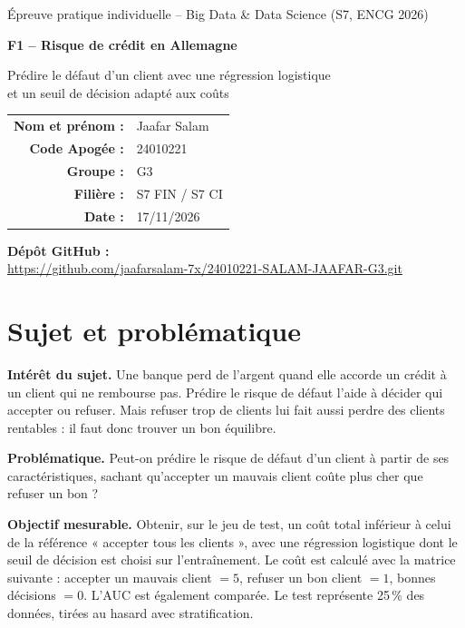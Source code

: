 \documentclass[11pt,a4paper]{article}
\begin{document}
\begin{titlepage}
\centering
\vspace*{2cm}
{\large Épreuve pratique individuelle -- Big Data \& Data Science (S7, ENCG 2026)\par}
\vspace{1.5cm}
{\Huge\bfseries F1 -- Risque de crédit en Allemagne\par}
\vspace{0.6cm}
{\Large Prédire le défaut d'un client avec une régression logistique\\
et un seuil de décision adapté aux coûts\par}
\vspace{2cm}
\begin{tabular}{rl}
\textbf{Nom et prénom :} & Jaafar Salam\\
\textbf{Code Apogée :} & 24010221\\
\textbf{Groupe :} & G3\\
\textbf{Filière :} & S7 FIN / S7 CI\\
\textbf{Date :} & 17/11/2026
\end{tabular}
\vfill
\textbf{Dépôt GitHub :}\\
\url{https://github.com/jaafarsalam-7x/24010221-SALAM-JAAFAR-G3.git}
\vspace{1cm}
\end{titlepage}

\tableofcontents
\newpage

\section{Sujet et problématique}
\textbf{Intérêt du sujet.} Une banque perd de l'argent quand elle accorde un crédit à un client qui ne rembourse pas. Prédire le risque de défaut l'aide à décider qui accepter ou refuser. Mais refuser trop de clients lui fait aussi perdre des clients rentables : il faut donc trouver un bon équilibre.

\textbf{Problématique.} Peut-on prédire le risque de défaut d'un client à partir de ses caractéristiques, sachant qu'accepter un mauvais client coûte plus cher que refuser un bon ?

\textbf{Objectif mesurable.} Obtenir, sur le jeu de test, un coût total inférieur à celui de la référence « accepter tous les clients », avec une régression logistique dont le seuil de décision est choisi sur l'entraînement. Le coût est calculé avec la matrice suivante : accepter un mauvais client $=5$, refuser un bon client $=1$, bonnes décisions $=0$. L'AUC est également comparée. Le test représente 25\,\% des données, tirées au hasard avec stratification.
\end{document}
